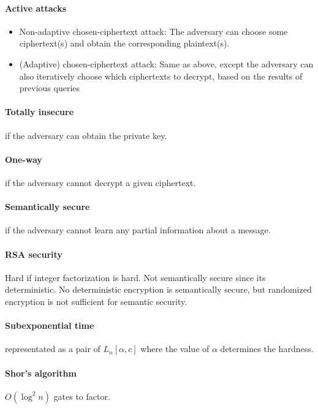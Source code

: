 \documentclass[11pt]{article}
\begin{document}
\paragraph{Active attacks}
\begin{itemize}
  \item Non-adaptive chosen-ciphertext attack: The adversary can choose some ciphertext(s)
    and obtain the corresponding plaintext(s).
  \item (Adaptive) chosen-ciphertext attack: Same as above, except the adversary can also
    iteratively choose which ciphertexts to decrypt, based on the results of previous queries
\end{itemize}

\paragraph{Totally insecure} if the adversary can obtain the private key.

\paragraph{One-way} if the adversary cannot decrypt a given ciphertext.

\paragraph{Semantically secure} if the adversary cannot learn any partial information about a message.

\paragraph{RSA security} Hard if integer factorization is hard. Not semantically secure since its deterministic. No deterministic encryption is semantically secure, but randomized encryption is not sufficient for semantic security.

\paragraph{Subexponential time} representated as a pair of $L_n[\alpha, c]$ where the value of $\alpha$ determines the hardness.

\paragraph{Shor's algorithm} $O(\log^2 n)$ gates to factor.
\end{document}
